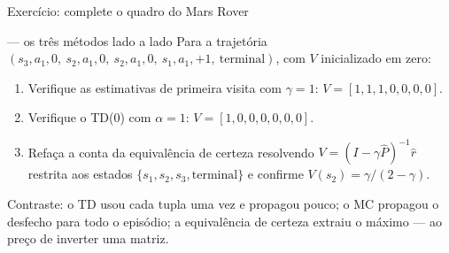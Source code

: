 \documentclass[aspectratio=169, 11pt]{beamer}
\begin{document}
\begin{frame}{Exercício: complete o quadro do Mars Rover}
  \begin{exbox}{— os três métodos lado a lado}
    Para a trajetória
    $(s_3, a_1, 0,\ s_2, a_1, 0,\ s_2, a_1, 0,\ s_1, a_1, +1,\ \text{terminal})$,
    com $V$ inicializado em zero:
    \begin{enumerate}\setlength{\itemsep}{0.15ex}
      \item Verifique as estimativas de primeira visita com $\gamma = 1$:
        $V = [1, 1, 1, 0, 0, 0, 0]$.
      \item Verifique o TD(0) com $\alpha = 1$:
        $V = [1, 0, 0, 0, 0, 0, 0]$.
      \item Refaça a conta da equivalência de certeza resolvendo
        $V = (I - \gamma \hat{P})^{-1} \hat{r}$ restrita aos estados
        $\{s_1, s_2, s_3, \text{terminal}\}$ e confirme
        $V(s_2) = \gamma/(2-\gamma)$.
    \end{enumerate}
  \end{exbox}

  \begin{ideiabox}
    Contraste: o TD usou cada tupla uma vez e propagou pouco; o MC
    propagou o desfecho para todo o episódio; a equivalência de certeza
    extraiu o máximo — ao preço de inverter uma matriz.
  \end{ideiabox}
\end{frame}
\end{document}
